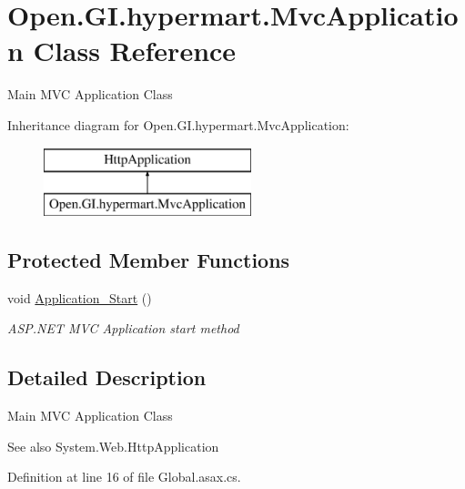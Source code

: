 \hypertarget{class_open_1_1_g_i_1_1hypermart_1_1_mvc_application}{}\section{Open.\+G\+I.\+hypermart.\+Mvc\+Application Class Reference}
\label{class_open_1_1_g_i_1_1hypermart_1_1_mvc_application}


Main M\+V\+C Application Class  


Inheritance diagram for Open.\+G\+I.\+hypermart.\+Mvc\+Application\+:\begin{figure}[H]
\begin{center}
\leavevmode
\includegraphics[height=2.000000cm]{class_open_1_1_g_i_1_1hypermart_1_1_mvc_application}
\end{center}
\end{figure}
\subsection*{Protected Member Functions}
\begin{DoxyCompactItemize}
\item 
void \hyperlink{class_open_1_1_g_i_1_1hypermart_1_1_mvc_application_a8169da76cd5c9b98983e4eee8d40ce4e}{Application\+\_\+\+Start} ()
\begin{DoxyCompactList}\small\item\em A\+S\+P.\+N\+E\+T M\+V\+C Application start method \end{DoxyCompactList}\end{DoxyCompactItemize}


\subsection{Detailed Description}
Main M\+V\+C Application Class 

\begin{DoxySeeAlso}{See also}
System.\+Web.\+Http\+Application


\end{DoxySeeAlso}


Definition at line 16 of file Global.\+asax.\+cs.



